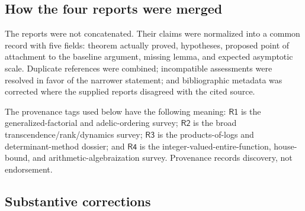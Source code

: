 \documentclass[10pt,letterpaper]{article}
\newcommand{\Rone}{\textsf{R1}}
\newcommand{\Rtwo}{\textsf{R2}}
\newcommand{\Rthree}{\textsf{R3}}
\newcommand{\Rfour}{\textsf{R4}}
\begin{document}
\subsection{How the four reports were merged}

The reports were not concatenated.  Their claims were normalized into a common record with
five fields: theorem actually proved, hypotheses, proposed point of attachment to the
baseline argument, missing lemma, and expected asymptotic scale.  Duplicate references were
combined; incompatible assessments were resolved in favor of the narrower statement; and
bibliographic metadata was corrected where the supplied reports disagreed with the cited
source.

The provenance tags used below have the following meaning:
\(\Rone\) is the generalized-factorial and adelic-ordering survey;
\(\Rtwo\) is the broad transcendence/rank/dynamics survey;
\(\Rthree\) is the products-of-logs and determinant-method dossier; and
\(\Rfour\) is the integer-valued-entire-function, house-bound, and arithmetic-algebraization
survey.  Provenance records discovery, not endorsement.

\subsection{Substantive corrections}
\end{document}
